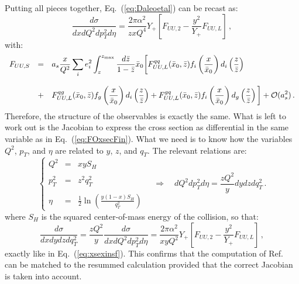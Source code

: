 \documentclass[10pt,a4paper]{article}
\begin{document}
Putting all pieces together, Eq.~(\ref{eq:Daleoetal}) can be recast as:
\begin{equation}
\frac{d\sigma}{dxdQ^2d p_T^2 d\eta} = \frac{2\pi \alpha^2
  }{z x Q^4}Y_+ \left[F_{UU,2} - \frac{y^2}{Y_+}F_{UU,L}\right]\,,
\end{equation}
with:
\begin{equation}
\begin{array}{rcl}
  F_{UU,S}&=&\displaystyle 
  a_s\frac{x }{Q^2}\sum_{i}e_i^2\int_z^{z_{\rm max}}
              \frac{d\bar{z}}{1-\bar{z}}\bar{x}_0\bigg[F^{qq}_{UU,L}(\bar{x}_0,\bar{z})f_i\left(\frac{x}{\bar{x}_0}\right)
              d_i\left(\frac{z}{\bar{z}}\right)\\
\\
&+&\displaystyle F^{qg}_{UU, L}(\bar{x}_0,\bar{z})f_g\left(\frac{x}{\bar{x}_0}\right)
              d_i\left(\frac{z}{\bar{z}}\right)+ F^{gq}_{UU, L}(\bar{x}_0,\bar{z})f_i\left(\frac{x}{\bar{x}_0}\right)
              d_g\left(\frac{z}{\bar{z}}\right)\bigg]
+\mathcal{O}(a_s^2)\,.
\end{array}
\end{equation}
Therefore, the structure of the observables is exactly the same. What
is left to work out is the Jacobian to express the cross section as
differential in the same variable as in Eq.~(\ref{eq:FOxsecFin}). What
we need is to know how the variables $Q^2$, $p_T$, and $\eta$ are
related to $y$, $z$, and $q_T$. The relevant relations are:
\begin{equation}
\left\{\begin{array}{rcl}
Q^2 &=& xyS_H\\
\\
p_T^2 &=& z^2 q_T^2\\
\\
\eta &=& \displaystyle \frac{1}{2}\ln\left(\frac{y(1-x)S_H}{q_T^2}\right)
\end{array}\right.\quad\Longrightarrow\quad dQ^2dp_T^2d\eta = \frac{zQ^2}{y} dydzdq_T^2\,.
\end{equation}
where $S_H$ is the squared center-of-mass energy of the collision, so
that:
\begin{equation}
  \frac{d\sigma}{dx dy dz dq_T^2} = \frac{zQ^2}{y}\frac{d\sigma}{dxdQ^2d p_T^2
    d\eta} = \frac{2\pi\alpha^2}{xyQ^2}Y_+\left[F_{UU,2}-\frac{y^2}{Y_+}F_{UU,L}\right]\,,
\end{equation}
exactly like in Eq.~(\ref{eq:xsexinsf}). This confirms that the
computation of Ref.~\cite{Daleo:2004pn} can be matched to the resummed
calculation provided that the correct Jacobian is taken into account.
\end{document}

